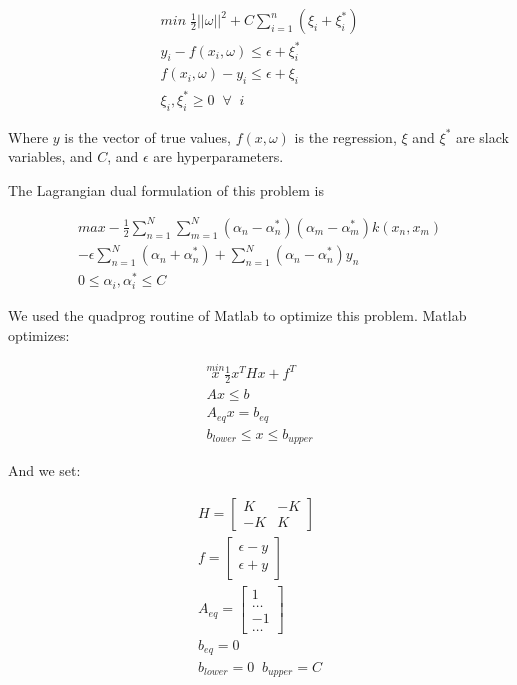 \documentclass[journal]{IEEEtran}
\begin{document}
\begin{gather}
min\; \frac{1}{2} || \omega ||^2 + C \sum_{i = 1}^{n} (\xi_i + \xi_i^*)\\
\nonumber y_i - f(x_i, \omega) \leq \epsilon + \xi_i^*\\
\nonumber f(x_i, \omega) - y_i \leq \epsilon + \xi_i\\
\nonumber \xi_i, \xi_i^* \geq 0 \; \; \forall \; \; i
\end{gather}

\noindent
Where $y$ is the vector of true values, $f(x, \omega)$ is the regression, $\xi$ and $\xi^*$ are slack variables, and $C$, and $\epsilon$ are hyperparameters.

The Lagrangian dual formulation of this problem is

\begin{gather}
max -\frac{1}{2} \sum_{n=1}^N \sum_{m=1}^N ( \alpha_n - \alpha_n^*)
      (\alpha_m - \alpha_m^*) k(x_n, x_m)\\
      \nonumber - \epsilon \sum_{n=1}^N(\alpha_n + \alpha_n^*) + \sum_{n=1}^N (\alpha_n - \alpha_n^*) y_n\\
\nonumber 0 \leq \alpha_i , \alpha_i^* \leq C
\end{gather}


We used the quadprog routine of Matlab to optimize this problem. Matlab optimizes:

\begin{gather}
\overset{min}{x} \frac{1}{2}x^T H x + f^T\\
\nonumber A x \leq b\\
\nonumber A_{eq} x = b_{eq}\\
\nonumber b_{lower} \leq x \leq b_{upper}
\end{gather}

\noindent And we set:

\begin{gather}
H = 
\begin{bmatrix}
K & -K\\
-K & K
\end{bmatrix}\\
f =
\begin{bmatrix}
\epsilon - y\\
\epsilon + y
\end{bmatrix}\\
A_{eq} = 
\begin{bmatrix}
1 \\
\dots \\
-1 \\
\dots
\end{bmatrix}\\
b_{eq} = 0\\
b_{lower} = 0 \; \; b_{upper} = C
\end{gather}
\end{document}
